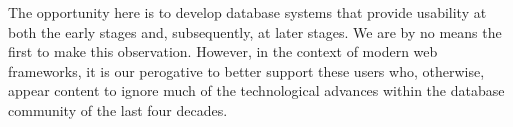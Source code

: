 The opportunity here is to develop database systems that provide
usability at both the early stages and, subsequently, at later
stages. We are by no means the first to make this
observation. However, in the context of modern web frameworks, it is
our perogative to better support these users who, otherwise, appear
content to ignore much of the technological advances within the
database community of the last four decades.




